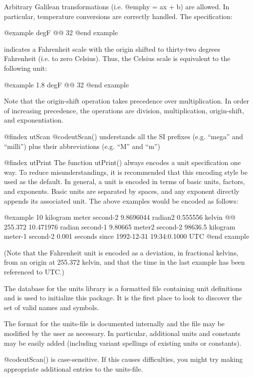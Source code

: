 {Arbitrary Galilean transformations (i.e. @emph{y = ax + b}) are
allowed.  In particular, temperature conversions are
correctly handled.  The specification:

@example
degF @@ 32
@end example

indicates a Fahrenheit scale with the origin shifted to
thirty-two degrees Fahrenheit (i.e. to zero Celsius).  Thus,
the Celsius scale is equivalent to the following unit:

@example
1.8 degF @@ 32
@end example

Note that the origin-shift operation takes precedence over
multiplication.  In order of increasing precedence, the
operations are division, multiplication, origin-shift, and
exponentiation.

@findex utScan
@code{utScan()} understands all the SI prefixes (e.g.  ``mega'' and
``milli'') plus their abbreviations (e.g. ``M'' and ``m'')

@findex utPrint
The function utPrint() always encodes a unit specification
one way.  To reduce misunderstandings, it is recommended
that this encoding style be used as the default. In general,
a unit is encoded in terms of basic units, factors, and
exponents.  Basic units are separated by spaces, and any
exponent directly appends its associated unit.  The above
examples would be encoded as follows:

@example
10 kilogram meter second-2
9.8696044 radian2
0.555556 kelvin @@ 255.372
10.471976 radian second-1
9.80665 meter2 second-2
98636.5 kilogram meter-1 second-2
0.001 seconds since 1992-12-31 19:34:0.1000 UTC
@end example

(Note that the Fahrenheit unit is encoded as a deviation, in
fractional kelvins, from an origin at 255.372 kelvin, and that the time
in the last example has been referenced to UTC.)

The database for the units library is a formatted file containing unit
definitions and is
used to initialize this package.  It is the first place to look to
discover the set of valid names and symbols.

The format for the units-file is documented internally and the file may be
modified by the user as necessary.  In particular, additional units and
constants may be easily added (including variant spellings of existing
units or constants).

@code{utScan()} is case-sensitive.  If this causes difficulties, you
might try making appropriate additional entries to the
units-file.

}
